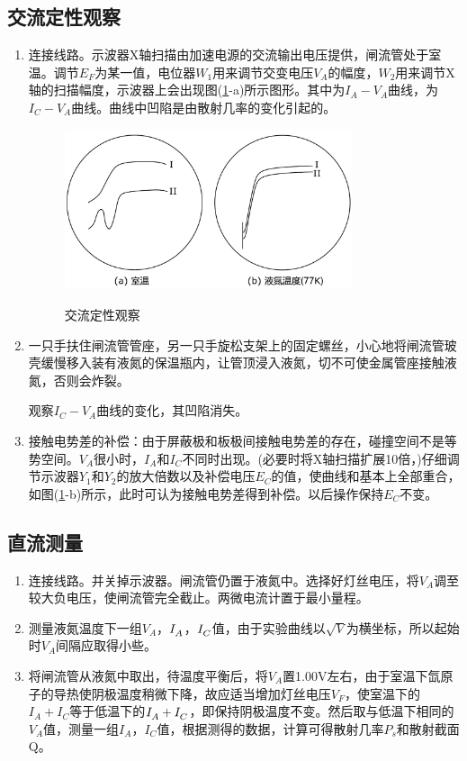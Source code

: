 \documentclass[a4paper]{article}
\newcommand{\rom}[1]{\textup{\uppercase\expandafter{\romannumeral#1}}}
\begin{document}
\subsection{交流定性观察}
\begin{enumerate}
\item 连接线路。示波器X轴扫描由加速电源的交流输出电压提供，闸流管处于室温。调节$E_F$为某一值，电位器$W_1$用来调节交变电压$V_A$的幅度，$W_2$用来调节X轴的扫描幅度，示波器上会出现图(\ref{fig12}-a)所示图形。其中\rom{1}为$I_A-V_A$曲线，\rom{2}为$I_C-V_A$曲线。曲线\rom{2}中凹陷是由散射几率的变化引起的。
\begin{figure}[!h]
\centering
\includegraphics[width=0.8\textwidth]{fig/fig12.pdf}\\
\caption{交流定性观察}\label{fig12}
\end{figure}

\item 一只手扶住闸流管管座，另一只手旋松支架上的固定螺丝，小心地将闸流管玻壳缓慢移入装有液氮的保温瓶内，让管顶浸入液氮，切不可使金属管座接触液氮，否则会炸裂。

观察$I_C-V_A$曲线的变化，其凹陷消失。
\item 接触电势差的补偿：由于屏蔽极和板极间接触电势差的存在，碰撞空间不是等势空间。$V_A$很小时，$I_A$和$I_C$不同时出现。(必要时将X轴扫描扩展10倍，)仔细调节示波器$Y_1$和$Y_2$的放大倍数以及补偿电压$E_C$的值，使曲线\rom{1}和\rom{2}基本上全部重合，如图(\ref{fig12}-b)所示，此时可认为接触电势差得到补偿。以后操作保持$E_C$不变。
\end{enumerate}
\subsection{直流测量}
\begin{enumerate}
\item 连接线路。并关掉示波器。闸流管仍置于液氮中。选择好灯丝电压，将$V_A$调至较大负电压，使闸流管完全截止。两微电流计置于最小量程。
\item 测量液氮温度下一组$V_A$，$I_A^{\*}$，$I_C^{\*}$值，由于实验曲线以$\sqrt{V}$为横坐标，所以起始时$V_A$间隔应取得小些。
\item 将闸流管从液氮中取出，待温度平衡后，将$V_A$置1.00V左右，由于室温下氙原子的导热使阴极温度稍微下降，故应适当增加灯丝电压$V_F$，使室温下的$I_A+I_C$等于低温下的$I_A^{\*}+I_C^{\*}$，即保持阴极温度不变。然后取与低温下相同的$V_A$值，测量一组$I_A$，$I_C$值，根据测得的数据，计算可得散射几率$P_s$和散射截面Q。
\end{enumerate}
\end{document}
